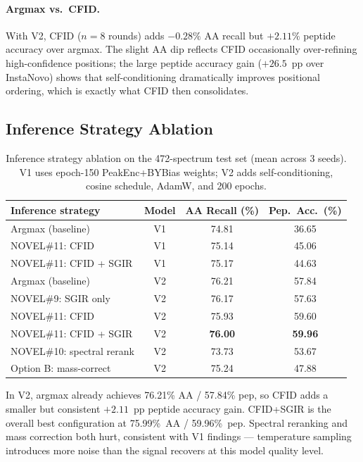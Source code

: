 \documentclass[11pt]{article}
\begin{document}
\paragraph{Argmax vs.\ CFID.}
With V2, CFID ($n{=}8$ rounds) adds $-0.28\%$ AA recall but $+2.11\%$ peptide
accuracy over argmax. The slight AA dip reflects CFID occasionally over-refining
high-confidence positions; the large peptide accuracy gain ($+26.5$~pp over
InstaNovo) shows that self-conditioning dramatically improves positional ordering,
which is exactly what CFID then consolidates.

\subsection{Inference Strategy Ablation}

\begin{table}[H]
\centering
\caption{Inference strategy ablation on the 472-spectrum test set (mean across 3 seeds).
  V1 uses epoch-150 PeakEnc+BYBias weights; V2 adds self-conditioning, cosine schedule,
  AdamW, and 200 epochs.}
\label{tab:ablation}
\begin{tabular}{lccc}
\toprule
\textbf{Inference strategy} & \textbf{Model} & \textbf{AA Recall (\%)} & \textbf{Pep.\ Acc.\ (\%)} \\
\midrule
Argmax (baseline)       & V1 & 74.81 & 36.65 \\
NOVEL\#11: CFID         & V1 & 75.14 & 45.06 \\
NOVEL\#11: CFID + SGIR  & V1 & 75.17 & 44.63 \\
\midrule
Argmax (baseline)       & V2 & 76.21 & 57.84 \\
NOVEL\#9: SGIR only     & V2 & 76.17 & 57.63 \\
NOVEL\#11: CFID         & V2 & 75.93 & 59.60 \\
\rowcolor{gray!15}
NOVEL\#11: CFID + SGIR  & V2 & \textbf{76.00} & \textbf{59.96} \\
NOVEL\#10: spectral rerank & V2 & 73.73 & 53.67 \\
Option B: mass-correct  & V2 & 75.24 & 47.88 \\
\bottomrule
\end{tabular}
\end{table}

In V2, argmax already achieves 76.21\% AA / 57.84\% pep, so CFID adds a smaller
but consistent $+2.11$~pp peptide accuracy gain. CFID+SGIR is the overall best
configuration at 75.99\%~AA / 59.96\%~pep. Spectral reranking and mass correction
both hurt, consistent with V1 findings --- temperature sampling introduces more
noise than the signal recovers at this model quality level.
\end{document}
